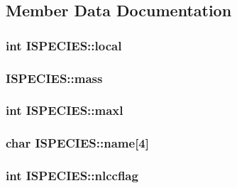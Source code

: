 \subsection{Member Data Documentation}
\hypertarget{struct_i_s_p_e_c_i_e_s_a1402f86199db95ba01663b2f50f2e465}{
\subsubsection[{local}]{\setlength{\rightskip}{0pt plus 5cm}int I\-S\-P\-E\-C\-I\-E\-S\-::local}}\label{struct_i_s_p_e_c_i_e_s_a1402f86199db95ba01663b2f50f2e465}
\hypertarget{struct_i_s_p_e_c_i_e_s_a027bea73176b41a47d1ef64e88e73295}{
\subsubsection[{mass}]{ I\-S\-P\-E\-C\-I\-E\-S\-::mass}}\label{struct_i_s_p_e_c_i_e_s_a027bea73176b41a47d1ef64e88e73295}
\hypertarget{struct_i_s_p_e_c_i_e_s_ae9189f2465cbf7b06022c60ff0a9430f}{
\subsubsection[{maxl}]{\setlength{\rightskip}{0pt plus 5cm}int I\-S\-P\-E\-C\-I\-E\-S\-::maxl}}\label{struct_i_s_p_e_c_i_e_s_ae9189f2465cbf7b06022c60ff0a9430f}
\hypertarget{struct_i_s_p_e_c_i_e_s_ad7825900213436986358d2fb66e8ed92}{
\subsubsection[{name}]{\setlength{\rightskip}{0pt plus 5cm}char I\-S\-P\-E\-C\-I\-E\-S\-::name\mbox{[}4\mbox{]}}}\label{struct_i_s_p_e_c_i_e_s_ad7825900213436986358d2fb66e8ed92}
\hypertarget{struct_i_s_p_e_c_i_e_s_ac9a0575c5ad036e57132c18fe26e592a}{
\subsubsection[{nlccflag}]{\setlength{\rightskip}{0pt plus 5cm}int I\-S\-P\-E\-C\-I\-E\-S\-::nlccflag}}\label{struct_i_s_p_e_c_i_e_s_ac9a0575c5ad036e57132c18fe26e592a}
